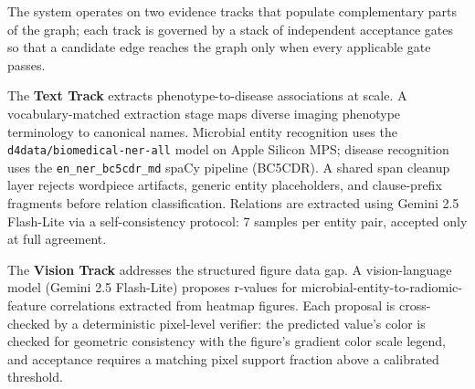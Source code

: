 \documentclass[12pt, letterpaper]{article}
\begin{document}
The system operates on two evidence tracks that populate complementary parts of the graph; each track is governed by a stack of independent acceptance gates so that a candidate edge reaches the graph only when every applicable gate passes.

The \textbf{Text Track} extracts phenotype-to-disease associations at scale. A vocabulary-matched extraction stage maps diverse imaging phenotype terminology to canonical names. Microbial entity recognition uses the \texttt{d4data/biomedical-ner-all} model on Apple Silicon MPS; disease recognition uses the \texttt{en\_ner\_bc5cdr\_md} spaCy pipeline (BC5CDR). A shared span cleanup layer rejects wordpiece artifacts, generic entity placeholders, and clause-prefix fragments before relation classification. Relations are extracted using Gemini 2.5 Flash-Lite via a self-consistency protocol: 7 samples per entity pair, accepted only at full agreement.

The \textbf{Vision Track} addresses the structured figure data gap. A vision-language model (Gemini 2.5 Flash-Lite) proposes r-values for microbial-entity-to-radiomic-feature correlations extracted from heatmap figures. Each proposal is cross-checked by a deterministic pixel-level verifier: the predicted value's color is checked for geometric consistency with the figure's gradient color scale legend, and acceptance requires a matching pixel support fraction above a calibrated threshold.
\end{document}
